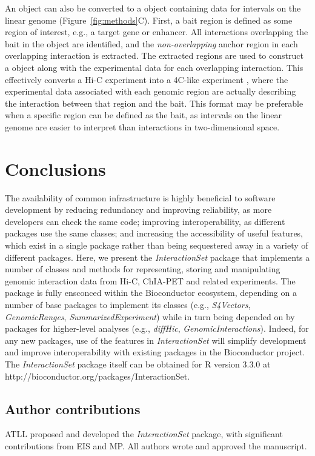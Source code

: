 \documentclass[10pt,a4paper,twocolumn]{article}
\begin{document}
An  object can also be converted to a  object containing data for intervals on the linear genome (Figure~\ref{fig:methods}C).
First, a bait region is defined as some region of interest, e.g., a target gene or enhancer.
All interactions overlapping the bait in the  object are identified, and the \textit{non-overlapping} anchor region in each overlapping interaction is extracted. 
The extracted regions are used to construct a  object along with the experimental data for each overlapping interaction.
This effectively converts a Hi-C experiment into a 4C-like experiment \cite{harmston2015genomicinteractions}, where the experimental data associated with each genomic region are actually describing the interaction between that region and the bait.
This format may be preferable when a specific region can be defined as the bait, as intervals on the linear genome are easier to interpret than interactions in two-dimensional space.

\section*{Conclusions}
The availability of common infrastructure is highly beneficial to software development by reducing redundancy and improving reliability, as more developers can check the same code;
improving interoperability, as different packages use the same classes; and increasing the accessibility of useful features, which exist in a single package rather than being sequestered away in a variety of different packages.
Here, we present the \textit{InteractionSet} package that implements a number of classes and methods for representing, storing and manipulating genomic interaction data from Hi-C, ChIA-PET and related experiments.
The package is fully ensconced within the Bioconductor ecosystem, depending on a number of base packages to implement its classes (e.g., \textit{S4Vectors}, \textit{GenomicRanges}, \textit{SummarizedExperiment}) while in turn being depended on by packages for higher-level analyses (e.g., \textit{diffHic}, \textit{GenomicInteractions}).
Indeed, for any new packages, use of the features in \textit{InteractionSet} will simplify development and improve interoperability with existing packages in the Bioconductor project.
The \textit{InteractionSet} package itself can be obtained for R version 3.3.0 at {http://bioconductor.org/packages/InteractionSet}.

\subsection*{Author contributions}
ATLL proposed and developed the \textit{InteractionSet} package, with significant contributions from EIS and MP.
All authors wrote and approved the manuscript.
\end{document}
